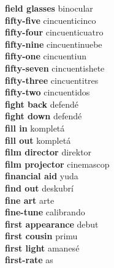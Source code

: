 \textbf{ field glasses  } binocular \\
\textbf{ fifty-five  } cincuenticinco \\
\textbf{ fifty-four  } cincuenticuatro \\
\textbf{ fifty-nine  } cincuentinuebe \\
\textbf{ fifty-one  } cincuentiun \\
\textbf{ fifty-seven  } cincuentishete \\
\textbf{ fifty-three  } cincuentitres \\
\textbf{ fifty-two  } cincuentidos \\
\textbf{ fight back  } defendé \\
\textbf{ fight down  } defendé \\
\textbf{ fill in  } kompletá \\
\textbf{ fill out  } kompletá \\
\textbf{ film director  } direktor \\
\textbf{ film projector  } cinemascop \\
\textbf{ financial aid  } yuda \\
\textbf{ find out  } deskubrí \\
\textbf{ fine art  } arte \\
\textbf{ fine-tune  } calibrando \\
\textbf{ first appearance  } debut \\
\textbf{ first cousin  } primu \\
\textbf{ first light  } amanesé \\
\textbf{ first-rate  } as \\
